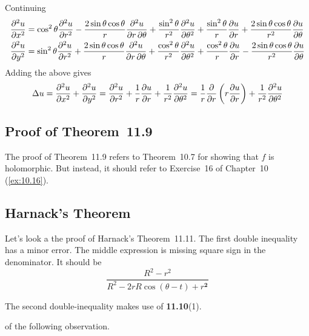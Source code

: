 Continuing
\begin{align*}
\frac{\partial^2 u}{\partial x^2}
 &= \cos^2\theta \frac{\partial^2 u}{\partial r^2}
    - \frac{2\sin\theta \cos\theta}{r} 
      \frac{\partial^2 u}{\partial r\,\partial \theta}
    + \frac{\sin^2 \theta}{r^2} \frac{\partial^2 u}{\partial \theta^2}
    + \frac{\sin^2 \theta}{r} \frac{\partial u}{\partial r}
    + \frac{2\sin\theta \cos\theta}{r^2}\frac{\partial u}{\partial \theta} \\
\frac{\partial^2 u}{\partial y^2}
 &= \sin^2\theta \frac{\partial^2 u}{\partial r^2}
    + \frac{2\sin\theta \cos\theta}{r} 
      \frac{\partial^2 u}{\partial r\,\partial \theta}
    + \frac{\cos^2 \theta}{r^2} \frac{\partial^2 u}{\partial \theta^2}
    + \frac{\cos^2 \theta}{r} \frac{\partial u}{\partial r}
    - \frac{2\sin\theta \cos\theta}{r^2}\frac{\partial u}{\partial \theta}
\end{align*}
Adding the above gives
\begin{equation*}
\Delta u 
= \frac{\partial^2 u}{\partial x^2} + \frac{\partial^2 u}{\partial y^2}
 = \frac{\partial^2 u}{\partial r^2} + \frac{1}{r}\frac{\partial u}{\partial r} 
    + \frac{1}{r^2}\frac{\partial^2 u}{\partial \theta^2}
 = \frac{1}{r}\frac{\partial}{\partial r}\left(r\frac{\partial u}{\partial r}\right)
    + \frac{1}{r^2}\frac{\partial^2 u}{\partial \theta^2}
\end{equation*}


\subsection{Proof of Theorem~11.9}

The proof of Theorem~11.9 refers to Theorem~10.7
for showing that $f$ is holomorphic. But instead, it should 
refer to Exercise~16 of Chapter~10 (\ref{ex:10.16}).

\subsection{Harnack's Theorem}

Let's look a the proof of Harnack's Theorem~11.11.
The first double inequality has a minor error.
The middle expression is missing square sign in the denominator.
It should be
\begin{equation*}
\frac{R^2 - r^2}{R^2 - 2rR\cos(\theta - t) + r^{\mathbf{2}}}
\end{equation*}

The second
double-inequality makes use of \textbf{11.10}(1).

\iffalse
of the following observation.

